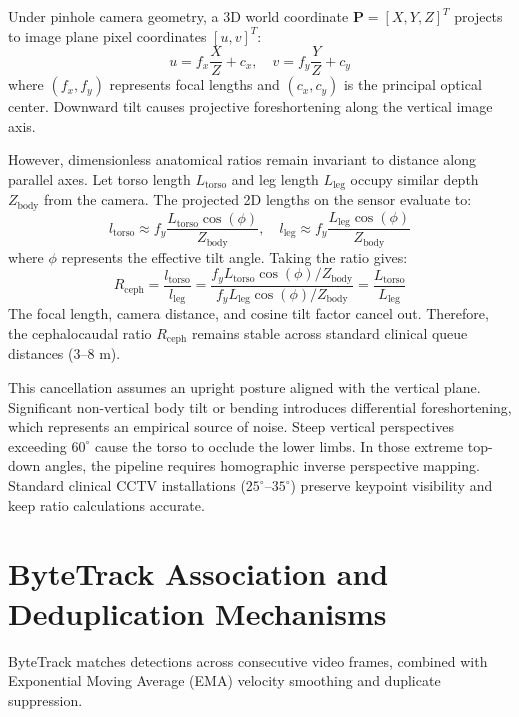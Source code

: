 Under pinhole camera geometry, a 3D world coordinate $\mathbf{P} = [X, Y, Z]^T$ projects to image plane pixel coordinates $[u, v]^T$:
\begin{equation}
    u = f_x \frac{X}{Z} + c_x, \quad v = f_y \frac{Y}{Z} + c_y
\end{equation}
where $(f_x, f_y)$ represents focal lengths and $(c_x, c_y)$ is the principal optical center. Downward tilt causes projective foreshortening along the vertical image axis.

However, dimensionless anatomical ratios remain invariant to distance along parallel axes. Let torso length $L_{\text{torso}}$ and leg length $L_{\text{leg}}$ occupy similar depth $Z_{\text{body}}$ from the camera. The projected 2D lengths on the sensor evaluate to:
\begin{equation}
    l_{\text{torso}} \approx f_y \frac{L_{\text{torso}} \cos(\phi)}{Z_{\text{body}}}, \quad l_{\text{leg}} \approx f_y \frac{L_{\text{leg}} \cos(\phi)}{Z_{\text{body}}}
\end{equation}
where $\phi$ represents the effective tilt angle. Taking the ratio gives:
\begin{equation}
    R_{\text{ceph}} = \frac{l_{\text{torso}}}{l_{\text{leg}}} = \frac{f_y L_{\text{torso}} \cos(\phi) / Z_{\text{body}}}{f_y L_{\text{leg}} \cos(\phi) / Z_{\text{body}}} = \frac{L_{\text{torso}}}{L_{\text{leg}}}
\end{equation}
The focal length, camera distance, and cosine tilt factor cancel out. Therefore, the cephalocaudal ratio $R_{\text{ceph}}$ remains stable across standard clinical queue distances ($3\text{--}8\text{ m}$).

This cancellation assumes an upright posture aligned with the vertical plane. Significant non-vertical body tilt or bending introduces differential foreshortening, which represents an empirical source of noise. Steep vertical perspectives exceeding $60^\circ$ cause the torso to occlude the lower limbs. In those extreme top-down angles, the pipeline requires homographic inverse perspective mapping. Standard clinical CCTV installations ($25^\circ\text{--}35^\circ$) preserve keypoint visibility and keep ratio calculations accurate.

\section{ByteTrack Association and Deduplication Mechanisms}
ByteTrack \cite{zhang2022bytetrack} matches detections across consecutive video frames, combined with Exponential Moving Average (EMA) velocity smoothing and duplicate suppression.

